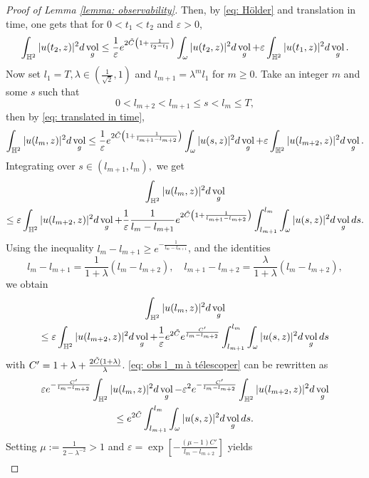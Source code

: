 \documentclass[letterpaper,11pt]{amsart}
\theoremstyle{note}
\numberwithin{equation}{section}
\DeclareMathOperator{\vol}{vol}
\begin{document}
\begin{proof}[Proof of Lemma \ref{lemma: observability}]
    Then, by \eqref{eq: Hölder} and translation in time, one gets that for $0 < t_1 < t_2$ and $\varepsilon > 0$, \begin{equation} \label{eq: translated in time}
    \int_{\mathbb{H}^2} |u(t_2,z)|^2 d\vol_g \leq \frac{1}{\varepsilon}e^{2\Tilde{C}\left(1+\frac{1}{t_2-t_1}\right)} \int_\omega |u(t_2,z)|^2 d\vol_g + \varepsilon \int_{\mathbb{H}^2} |u(t_1,z)|^2 d\vol_g.\end{equation} Now set $l_1 = T, \lambda \in (\frac{1}{\sqrt{2}},1)$ and $l_{m+1} = \lambda^m l_1$ for $m \geq 0$. Take an integer $m$ and some $s$ such that $$0 < l_{m+2} < l_{m+1} \leq s < l_m \leq T,$$ then by \eqref{eq: translated in time}, $$\int_{\mathbb{H}^2} |u(l_m,z)|^2 d\vol_g \leq \frac{1}{\varepsilon} e^{2\Tilde{C}\left(1 + \frac{1}{l_{m+1} - l_{m+2}}\right)} \int_\omega|u(s,z)|^2 d\vol_g + \varepsilon \int_{\mathbb{H}^2} |u(l_{m+2},z)|^2 d\vol_g.$$ 
    Integrating over $s \in (l_{m+1},l_m),$ we get \begin{multline}\int_{\mathbb{H}^2} |u(l_m,z)|^2 d\vol_g \\ \leq \varepsilon \int_{\mathbb{H}^2} |u(l_{m+2},z)|^2 d\vol_g + \frac{1}{\varepsilon} \frac{1}{l_m-l_{m+1}} e^{2\Tilde{C}\left(1 + \frac{1}{l_{m+1} - l_{m+2}}\right)} \int_{l_{m+1}}^{l_m}\int_\omega|u(s,z)|^2 d\vol_g ds.\end{multline} Using the inequality $l_m - l_{m+1} \geq e^{-\frac{1}{l_m-l_{m+1}}}$, and the identities $$l_m-l_{m+1} = \frac{1}{1+\lambda}(l_m - l_{m+2}), \quad l_{m+1} - l_{m+2} = \frac{\lambda}{1+\lambda} (l_m-l_{m+2}),$$ we obtain  \begin{multline}
    \label{eq: obs l_m à télescoper}
    \int_{\mathbb{H}^2} |u(l_m,z)|^2 d\vol_g \\ \leq \varepsilon \int_{\mathbb{H}^2} |u(l_{m+2},z)|^2 d\vol_g + \frac{1}{\varepsilon} e^{2\Tilde{C}} e^{\frac{C'}{l_m - l_{m+2}}} \int_{l_{m+1}}^{l_m}\int_\omega|u(s,z)|^2 d\vol_g ds\end{multline} with $C' = 1 + \lambda + \frac{2\Tilde{C}(1+\lambda)}{\lambda}$. \eqref{eq: obs l_m à télescoper} can be rewritten as \begin{multline}
        \varepsilon e^{-\frac{C'}{l_m - l_{m+2}}} \int_{\mathbb{H}^2} |u(l_m,z)|^2 d\vol_g - \varepsilon^2 e^{-\frac{C'}{l_m - l_{m+2}}} \int_{\mathbb{H}^2} |u(l_{m+2},z)|^2 d\vol_g \\ \leq e^{2\Tilde{C}} \int_{l_{m+1}}^{l_m}\int_\omega|u(s,z)|^2 d\vol_g ds.
    \end{multline} Setting $\mu:= \frac{1}{2-\lambda^{-2}} > 1$ and $\varepsilon = \exp\left[-\frac{(\mu-1)C'}{l_m-l_{m+2}}\right]$ yields \begin{multline}

\end{multline}
\end{proof}
\end{document}
